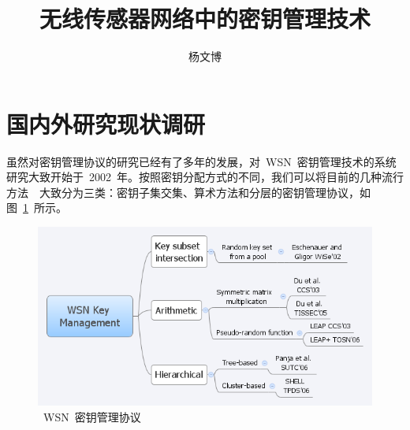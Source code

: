 \documentclass[a4paper,10pt]{article}
\title{无线传感器网络中的密钥管理技术}
\author{杨文博}
\begin{document}
\maketitle

\section{国内外研究现状调研}

虽然对密钥管理协议的研究已经有了多年的发展，对~WSN~密钥管理技术的系统研究大致开始于~2002~年。按照密钥分配方式的不同，我们可以将目前的几种流行方法~\cite{Lee2007}~大致分为三类：密钥子集交集、算术方法和分层的密钥管理协议，如图~\ref{wsn_keyman_1}~所示。

\begin{figure}[htbp]
  \centering
  \includegraphics[width=.9\textwidth,keepaspectratio]{wsn_keyman_1}
  \caption{\label{wsn_keyman_1}~WSN~密钥管理协议}
\end{figure}
\end{document}
